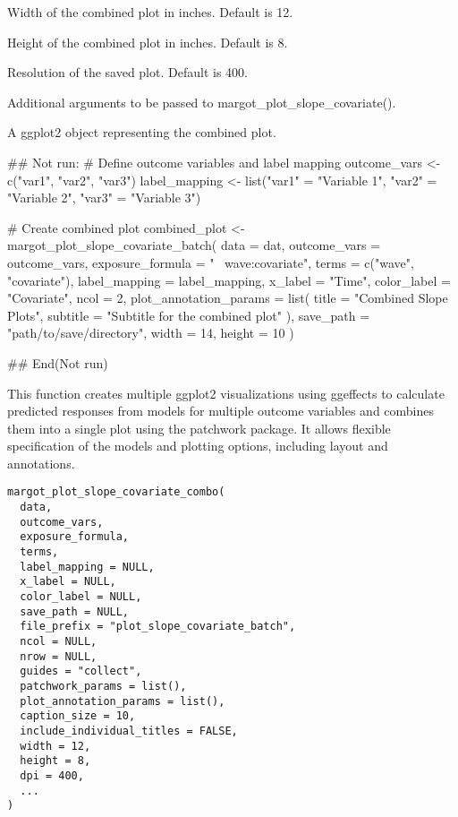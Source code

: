\documentclass[a4paper]{book}
\begin{document}
\begin{Arguments}
\begin{ldescription}
\item[\code{width}] Width of the combined plot in inches. Default is 12.

\item[\code{height}] Height of the combined plot in inches. Default is 8.

\item[\code{dpi}] Resolution of the saved plot. Default is 400.

\item[\code{...}] Additional arguments to be passed to margot\_plot\_slope\_covariate().
\end{ldescription}
\end{Arguments}
%
\begin{Value}
A ggplot2 object representing the combined plot.
\end{Value}
%
\begin{Examples}
\begin{ExampleCode}
## Not run: 
# Define outcome variables and label mapping
outcome_vars <- c("var1", "var2", "var3")
label_mapping <- list("var1" = "Variable 1", "var2" = "Variable 2", "var3" = "Variable 3")

# Create combined plot
combined_plot <- margot_plot_slope_covariate_batch(
  data = dat,
  outcome_vars = outcome_vars,
  exposure_formula = "~ wave:covariate",
  terms = c("wave", "covariate"),
  label_mapping = label_mapping,
  x_label = "Time",
  color_label = "Covariate",
  ncol = 2,
  plot_annotation_params = list(
    title = "Combined Slope Plots",
    subtitle = "Subtitle for the combined plot"
  ),
  save_path = "path/to/save/directory",
  width = 14,
  height = 10
)

## End(Not run)
\end{ExampleCode}
\end{Examples}
%
\begin{Description}
This function creates multiple ggplot2 visualizations using ggeffects to calculate
predicted responses from models for multiple outcome variables and combines them
into a single plot using the patchwork package. It allows flexible specification
of the models and plotting options, including layout and annotations.
\end{Description}
%
\begin{Usage}
\begin{verbatim}
margot_plot_slope_covariate_combo(
  data,
  outcome_vars,
  exposure_formula,
  terms,
  label_mapping = NULL,
  x_label = NULL,
  color_label = NULL,
  save_path = NULL,
  file_prefix = "plot_slope_covariate_batch",
  ncol = NULL,
  nrow = NULL,
  guides = "collect",
  patchwork_params = list(),
  plot_annotation_params = list(),
  caption_size = 10,
  include_individual_titles = FALSE,
  width = 12,
  height = 8,
  dpi = 400,
  ...
)
\end{verbatim}
\end{Usage}
\end{document}
